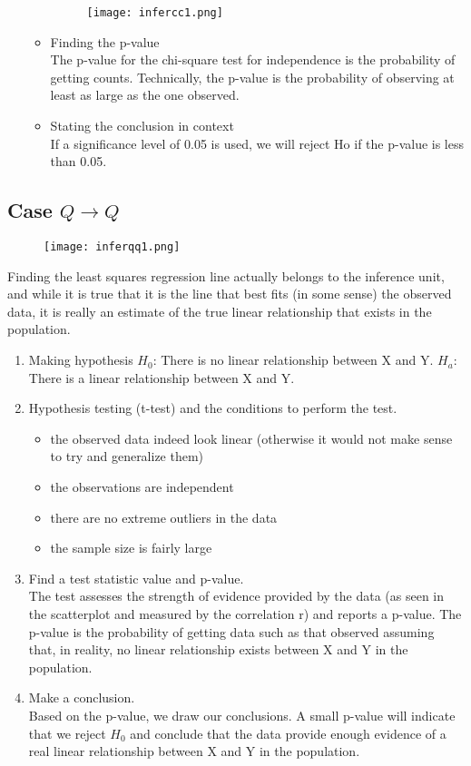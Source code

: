\documentclass[10pt, a4paper]{article}
\begin{document}
\begin{enumerate}
\begin{itemize}
\begin{figure}
[h!]
\centering
\texttt{[image: infercc1.png]}
\end{figure}
\item Finding the p-value\\
The p-value for the chi-square test for independence is the probability of getting counts. Technically, the p-value is the probability of observing at least as large as the one observed.
\item  Stating the conclusion in context\\
If a significance level of 0.05 is used, we will reject Ho if the p-value is less than 0.05.
\end{itemize}
\end{enumerate}
\subsection{Case $ Q\rightarrow Q$}
\begin{figure}
[h!]
\centering
\texttt{[image: inferqq1.png]}
\end{figure}
Finding the least squares regression line actually belongs to the inference unit, and while it is true that it is the line that best fits (in some sense) the observed data, it is really an estimate of the true linear relationship that exists in the population. \par
\begin{enumerate}
\item Making hypothesis
    $H_0$: There is no linear relationship between X and Y.
    $H_a$: There is a linear relationship between X and Y.
\item Hypothesis testing (t-test) and the conditions to perform the test.
\begin{itemize}
\item the observed data indeed look linear (otherwise it would not make sense to try and generalize them)
\item the observations are independent
\item there are no extreme outliers in the data
\item the sample size is fairly large
\end{itemize}
\item Find a test statistic value and p-value.\\
The test assesses the strength of evidence provided by the data (as seen in the scatterplot and measured by the correlation r) and reports a p-value. The p-value is the probability of getting data such as that observed assuming that, in reality, no linear relationship exists between X and Y in the population.
\item Make a conclusion.\\
Based on the p-value, we draw our conclusions. A small p-value will indicate that we reject $H_0$ and conclude that the data provide enough evidence of a real linear relationship between X and Y in the population.
\end{enumerate}


\end{document}
